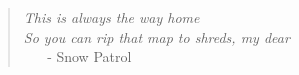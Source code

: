 
%
%

\cleardoublepage

\thispagestyle{empty}
\vspace*{5cm} 
\begin{quote} 
	\begin{flushright}
	
		\textit{This is always the way home}\\
		\textit{So you can rip that map to shreds, my dear}\\
		~ ~ {\footnotesize- Snow Patrol}
		
	\end{flushright}
\end{quote}

\cleardoublepage



